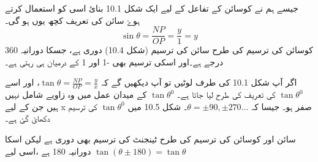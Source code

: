 
جیسے ہم نے کوسائن کے تفاعل کے لیے ایک شکل  10.1 بنائ اسی کو استعمال کرتے ہوۓ سائن کی تعریف کچھ یوں ہو گی۔
\[\sin\theta=\frac{NP}{OP}=\frac{y}{1}=y\]
کوسائن کی ترسیم کی طرح سائن کی ترسیم (شکل 10.4) دوری ہے، جسکا دورانیہ 360 درجے ہے۔اور اسکی ترسیم بھی -1 اور 1 کے درمیان ہی رہتی ہے۔

اگر آپ شکل 10.1 کی طرف لوٹیں تو آپ دیکھیں گے کہ \(\tan\theta=\frac{NP}{OP}=\frac{y}{x}\)، اور اسے \(\tan{\theta}^{0}\) کی تعریف کی طرح لیا جاتا ہے۔  \(\tan{\theta}^{0}\) کے میدان عمل میں وہ زاویے شامل نہیں ہیں جن کے لیے x    صفر ہو۔ جیسا کہ  \(\theta=\pm90,\pm270\dotsc\)۔ شکل 10.5 میں \(\tan{\theta}^{0}\) کی ترسیم دکھائ گئ ہے۔
 
سائن اور کوسائن کی ترسیم کی طرح ٹینجنٹ کی ترسیم بھی دوری ہے لیکن اسکا دورانیہ 180 ہے ،اسی لیے \(\tan(\theta\pm180)=\tan\theta\)




